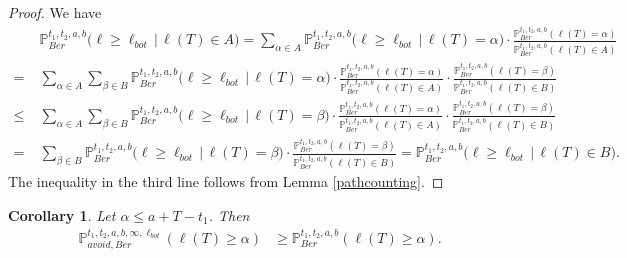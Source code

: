 \documentclass[12pt]{article}
\newtheorem{cor}{Corollary}
\begin{document}
	\begin{proof}
		We have
		\begin{align*}
			& \mathbb{P}^{t_1, t_2, a, b}_{Ber}\big(\ell \geq \ell_{bot}\,\big|\,\ell(T) \in A\big) = \sum_{\alpha\in A} \mathbb{P}^{t_1, t_2, a, b}_{Ber}\big(\ell \geq \ell_{bot}\,\big|\,\ell(T) = \alpha\big) \cdot \frac{\mathbb{P}^{t_1, t_2, a, b}_{Ber}(\ell(T) = \alpha)}{\mathbb{P}^{t_1, t_2, a, b}_{Ber}(\ell(T) \in A)}\\
			= \; & \sum_{\alpha\in A}\sum_{\beta\in B} \mathbb{P}^{t_1, t_2, a, b}_{Ber}\big(\ell \geq \ell_{bot}\,\big|\,\ell(T) = \alpha\big) \cdot \frac{\mathbb{P}^{t_1, t_2, a, b}_{Ber}(\ell(T) = \alpha)}{\mathbb{P}^{t_1, t_2, a, b}_{Ber}(\ell(T) \in A)} \cdot \frac{\mathbb{P}^{t_1, t_2, a, b}_{Ber}(\ell(T) = \beta)}{\mathbb{P}^{t_1, t_2, a, b}_{Ber}(\ell(T) \in B)}\\
			\leq \; & \sum_{\alpha\in A}\sum_{\beta\in B} \mathbb{P}^{t_1, t_2, a, b}_{Ber}\big(\ell \geq \ell_{bot}\,\big|\,\ell(T) = \beta\big) \cdot \frac{\mathbb{P}^{t_1, t_2, a, b}_{Ber}(\ell(T) = \alpha)}{\mathbb{P}^{t_1, t_2, a, b}_{Ber}(\ell(T) \in A)} \cdot \frac{\mathbb{P}^{t_1, t_2, a, b}_{Ber}(\ell(T) = \beta)}{\mathbb{P}^{t_1, t_2, a, b}_{Ber}(\ell(T) \in B)}\\
			= \; & \sum_{\beta \in B} \mathbb{P}^{t_1, t_2, a, b}_{Ber}\big(\ell \geq \ell_{bot}\,\big|\,\ell(T) = \beta\big) \cdot \frac{\mathbb{P}^{t_1, t_2, a, b}_{Ber}(\ell(T) = \beta)}{\mathbb{P}^{t_1, t_2, a, b}_{Ber}(\ell(T) \in B)} = \mathbb{P}^{t_1, t_2, a, b}_{Ber}\big(\ell \geq \ell_{bot}\,\big|\,\ell(T) \in B\big).
		\end{align*}
		The inequality in the third line follows from Lemma \ref{pathcounting}.
	\end{proof}

	\begin{cor}\label{freeavoidbound}
		Let $\alpha \leq a + T - t_1$. Then
		\begin{align*}
		\mathbb{P}^{t_1,t_2,a,b,\infty,\ell_{bot}}_{avoid,Ber} (\ell(T)\geq\alpha) &\geq \mathbb{P}^{t_1,t_2,a,b}_{Ber} (\ell(T)\geq \alpha).
		\end{align*}
	\end{cor}
\end{document}
